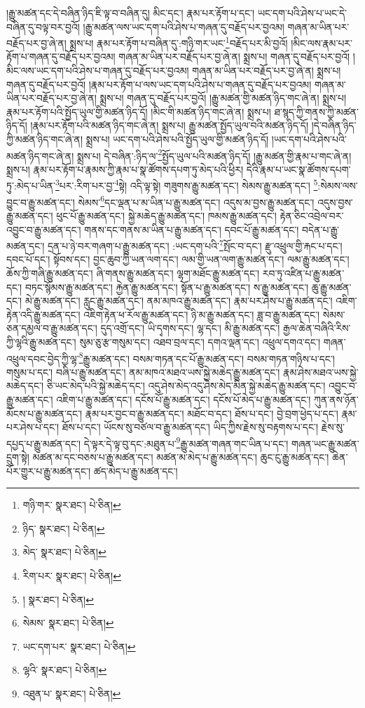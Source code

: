 །རྒྱུ་མཚན་དང་དེ་བཞིན་ཉིད་ཇི་ལྟ་བ་བཞིན་དུ། མིང་དང་། རྣམ་པར་རྟོག་པ་དང་། ཡང་དག་པའི་ཤེས་པ་ཡང་དེ་བཞིན་དུ་བལྟ་བར་བྱའོ། །རྒྱུ་མཚན་ལས་ཡང་དག་པའི་ཤེས་པ་གཞན་དུ་བརྗོད་པར་བྱའམ། གཞན་མ་ཡིན་པར་བརྗོད་པར་བྱ་ཞེ་ན། སྨྲས་པ། རྣམ་པར་རྟོག་པ་བཞིན་དུ་:གཉི་གར་ཡང་\footnote{གཉི་གར་  སྣར་ཐང་།  པེ་ཅིན། }བརྗོད་པར་མི་བྱའོ། །མིང་ལས་རྣམ་པར་རྟོག་པ་གཞན་དུ་བརྗོད་པར་བྱའམ། གཞན་མ་ཡིན་པར་བརྗོད་པར་བྱ་ཞེ་ན། སྨྲས་པ། གཞན་དུ་བརྗོད་པར་བྱའོ། །མིང་ལས་ཡང་དག་པའི་ཤེས་པ་གཞན་དུ་བརྗོད་པར་བྱའམ། གཞན་མ་ཡིན་པར་བརྗོད་པར་བྱ་ཞེ་ན། སྨྲས་པ། གཞན་དུ་བརྗོད་པར་བྱའོ། །རྣམ་པར་རྟོག་པ་ལས་ཡང་དག་པའི་ཤེས་པ་གཞན་དུ་བརྗོད་པར་བྱའམ། གཞན་མ་ཡིན་པར་བརྗོད་པར་བྱ་ཞེ་ན། སྨྲས་པ། གཞན་དུ་བརྗོད་པར་བྱའོ། །རྒྱུ་མཚན་གྱི་མཚན་ཉིད་གང་ཞེ་ན། སྨྲས་པ། རྣམ་པར་རྟོག་པའི་སྤྱོད་ཡུལ་གྱི་མཚན་ཉིད་དོ། །མིང་གི་མཚན་ཉིད་གང་ཞེ་ན། སྨྲས་པ། ཐ་སྙད་ཀྱི་གནས་ཀྱི་མཚན་ཉིད་དོ། །རྣམ་པར་རྟོག་པའི་མཚན་ཉིད་གང་ཞེ་ན། སྨྲས་པ། རྒྱུ་མཚན་སྤྱོད་ཡུལ་བའི་མཚན་ཉིད་དོ། །དེ་བཞིན་ཉིད་ཀྱི་མཚན་ཉིད་གང་ཞེ་ན། སྨྲས་པ། ཡང་དག་པའི་ཤེས་པའི་སྤྱོད་ཡུལ་གྱི་མཚན་ཉིད་དོ། །ཡང་དག་པའི་ཤེས་པའི་མཚན་ཉིད་གང་ཞེ་ན། སྨྲས་པ། དེ་བཞིན་:ཉིད་ལ་\footnote{ཉིད་  སྣར་ཐང་།  པེ་ཅིན། }སྤྱོད་ཡུལ་པའི་མཚན་ཉིད་དོ། །རྒྱུ་མཚན་གྱི་རྣམ་པ་གང་ཞེ་ན། སྨྲས་པ། རྣམ་པར་རྟོག་པ་རྣམས་ཀྱི་རྣམ་པ་སྣ་ཚོགས་དཔག་ཏུ་མེད་པའི་ཕྱིར། དེའི་རྣམ་པ་ཡང་སྣ་ཚོགས་དཔག་ཏུ་:མེད་པ་ཡིན་\footnote{མེད་  སྣར་ཐང་།  པེ་ཅིན། }པར་:རིག་པར་བྱ་\footnote{རིག་པར་  སྣར་ཐང་།  པེ་ཅིན། }སྟེ། འདི་ལྟ་སྟེ། གཟུགས་རྒྱུ་མཚན་དང་། སེམས་རྒྱུ་མཚན་དང་། \footnote{།    སྣར་ཐང་།  པེ་ཅིན། }:སེམས་ལས་བྱུང་བ་རྒྱུ་མཚན་དང་། སེམས་\footnote{སེམས་  སྣར་ཐང་།  པེ་ཅིན། }དང་ལྡན་པ་མ་ཡིན་པ་རྒྱུ་མཚན་དང་། འདུས་མ་བྱས་རྒྱུ་མཚན་དང་། འདུས་བྱས་རྒྱུ་མཚན་དང་། ཕུང་པོ་རྒྱུ་མཚན་དང་། སྐྱེ་མཆེད་རྒྱུ་མཚན་དང་། ཁམས་རྒྱུ་མཚན་དང་། རྟེན་ཅིང་འབྲེལ་བར་འབྱུང་བ་རྒྱུ་མཚན་དང་། གནས་དང་གནས་མ་ཡིན་པ་རྒྱུ་མཚན་དང་། དབང་པོ་རྒྱུ་མཚན་དང་། བདེན་པ་རྒྱུ་མཚན་དང་། དྲན་པ་ཉེ་བར་གཞག་པ་རྒྱུ་མཚན་དང་། :ཡང་དག་པའི་\footnote{ཡང་དག་པར་  སྣར་ཐང་།  པེ་ཅིན། }སྤོང་བ་དང་། རྫུ་འཕྲུལ་གྱི་རྐང་པ་དང་། དབང་པོ་དང་། སྟོབས་དང་། བྱང་ཆུབ་ཀྱི་ཡན་ལག་དང་། ལམ་གྱི་ཡན་ལག་རྒྱུ་མཚན་དང་། ལམ་རྒྱུ་མཚན་དང་། ཆོས་ཀྱི་གཞི་རྒྱུ་མཚན་དང་། ཞི་གནས་རྒྱུ་མཚན་དང་། ལྷག་མཐོང་རྒྱུ་མཚན་དང་། རབ་ཏུ་འཛིན་པ་རྒྱུ་མཚན་དང་། བཏང་སྙོམས་རྒྱུ་མཚན་དང་། རྐྱེན་རྒྱུ་མཚན་དང་། སྟོན་པ་རྒྱུ་མཚན་དང་། ས་རྒྱུ་མཚན་དང་། ཆུ་རྒྱུ་མཚན་དང་། མེ་རྒྱུ་མཚན་དང་། རླུང་རྒྱུ་མཚན་དང་། ནམ་མཁའ་རྒྱུ་མཚན་དང་། རྣམ་པར་ཤེས་པ་རྒྱུ་མཚན་དང་། འཇིག་རྟེན་འདི་རྒྱུ་མཚན་དང་། འཇིག་རྟེན་ཕ་རོལ་རྒྱུ་མཚན་དང་། ཉི་མ་རྒྱུ་མཚན་དང་། ཟླ་བ་རྒྱུ་མཚན་དང་། སེམས་ཅན་དམྱལ་བ་རྒྱུ་མཚན་དང་། དུད་འགྲོ་དང་། ཡི་དྭགས་དང་། ལྷ་དང་། མི་རྒྱུ་མཚན་དང་། རྒྱལ་ཆེན་བཞིའི་རིས་ཀྱི་ལྷའི་རྒྱུ་མཚན་དང་། སུམ་ཅུ་རྩ་གསུམ་དང་། འཐབ་བྲལ་དང་། དགའ་ལྡན་དང་། འཕྲུལ་དགའ་དང་། གཞན་འཕྲུལ་དབང་བྱེད་ཀྱི་ལྷ་\footnote{ལྷའི་  སྣར་ཐང་།  པེ་ཅིན། }རྒྱུ་མཚན་དང་། བསམ་གཏན་དང་པོ་རྒྱུ་མཚན་དང་། བསམ་གཏན་གཉིས་པ་དང་། གསུམ་པ་དང་། བཞི་པ་རྒྱུ་མཚན་དང་། ནམ་མཁའ་མཐའ་ཡས་སྐྱེ་མཆེད་རྒྱུ་མཚན་དང་། རྣམ་ཤེས་མཐའ་ཡས་སྐྱེ་མཆེད་དང་། ཅི་ཡང་མེད་པའི་སྐྱེ་མཆེད་དང་། འདུ་ཤེས་མེད་འདུ་ཤེས་མེད་མིན་སྐྱེ་མཆེད་རྒྱུ་མཚན་དང་། འབྱུང་བ་རྒྱུ་མཚན་དང་། འཇིག་པ་རྒྱུ་མཚན་དང་། དངོས་པོ་རྒྱུ་མཚན་དང་། དངོས་པོ་མེད་པ་རྒྱུ་མཚན་དང་། ཀུན་ནས་ཉོན་མོངས་པ་རྒྱུ་མཚན་དང་། རྣམ་པར་བྱང་བ་རྒྱུ་མཚན་དང་། མཐོང་བ་དང་། ཐོས་པ་དང་། བྱེ་བྲག་ཕྱེད་པ་དང་། རྣམ་པར་ཤེས་པ་དང་། ཐོས་པ་དང་། ཡོངས་སུ་བཙལ་བ་རྒྱུ་མཚན་དང་། ཡིད་ཀྱིས་རྗེས་སུ་བརྟགས་པ་དང་། རྗེས་སུ་དཔྱད་པ་རྒྱུ་མཚན་དང་། དེ་ལྟར་དེ་ལྟ་བུ་དང་:མཐུན་པ་\footnote{འཐུན་པ་  སྣར་ཐང་།  པེ་ཅིན། }རྒྱུ་མཚན་གཞན་གང་ཡིན་པ་དང་། གཞན་ཡང་རྒྱུ་མཚན་དྲུག་སྟེ། མཚན་མ་དང་བཅས་པ་རྒྱུ་མཚན་དང་། མཚན་མ་མེད་པ་རྒྱུ་མཚན་དང་། ཆུང་ངུ་རྒྱུ་མཚན་དང་། ཆེན་པོར་གྱུར་པ་རྒྱུ་མཚན་དང་། ཚད་མེད་པ་རྒྱུ་མཚན་དང་། 